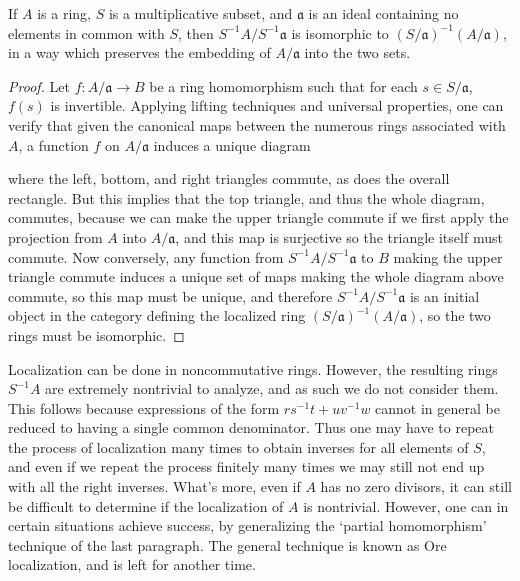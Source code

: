 \begin{prop}
    If $A$ is a ring, $S$ is a multiplicative subset, and $\mathfrak{a}$ is an ideal containing no elements in common with $S$, then $S^{-1}A/S^{-1}\mathfrak{a}$ is isomorphic to $(S/\mathfrak{a})^{-1}(A/\mathfrak{a})$, in a way which preserves the embedding of $A/\mathfrak{a}$ into the two sets.
\end{prop}
\begin{proof}
    Let $f: A/\mathfrak{a} \to B$ be a ring homomorphism such that for each $s \in S/\mathfrak{a}$, $f(s)$ is invertible. Applying lifting techniques and universal properties, one can verify that given the canonical maps between the numerous rings associated with $A$, a function $f$ on $A/\mathfrak{a}$ induces a unique diagram
    \begin{center}
    \end{center}
    where the left, bottom, and right triangles commute, as does the overall rectangle. But this implies that the top triangle, and thus the whole diagram, commutes, because we can make the upper triangle commute if we first apply the projection from $A$ into $A/\mathfrak{a}$, and this map is surjective so the triangle itself must commute. Now conversely, any function from $S^{-1}A/S^{-1}\mathfrak{a}$ to $B$ making the upper triangle commute induces a unique set of maps making the whole diagram above commute, so this map must be unique, and therefore $S^{-1}A/S^{-1}\mathfrak{a}$ is an initial object in the category defining the localized ring $(S/\mathfrak{a})^{-1}(A/\mathfrak{a})$, so the two rings must be isomorphic.
\end{proof}

Localization can be done in noncommutative rings. However, the resulting rings $S^{-1}A$ are extremely nontrivial to analyze, and as such we do not consider them. This follows because expressions of the form $rs^{-1}t + uv^{-1}w$ cannot in general be reduced to having a single common denominator. Thus one may have to repeat the process of localization many times to obtain inverses for all elements of $S$, and even if we repeat the process finitely many times we may still not end up with all the right inverses. What's more, even if $A$ has no zero divisors, it can still be difficult to determine if the localization of $A$ is nontrivial. However, one can in certain situations achieve success, by generalizing the `partial homomorphism' technique of the last paragraph. The general technique is known as Ore localization, and is left for another time.

